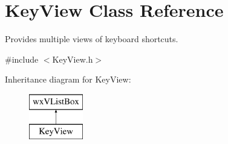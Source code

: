 \hypertarget{class_key_view}{}\section{Key\+View Class Reference}
\label{class_key_view}


Provides multiple views of keyboard shortcuts.  




{\ttfamily \#include $<$Key\+View.\+h$>$}

Inheritance diagram for Key\+View\+:\begin{figure}[H]
\begin{center}
\leavevmode
\includegraphics[height=2.000000cm]{class_key_view}
\end{center}
\end{figure}
